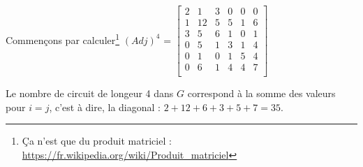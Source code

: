 \documentclass[fontsize=10pt]{article}
\begin{document}
Commençons par calculer\footnote{Ça n'est que du produit matriciel : \url{https://fr.wikipedia.org/wiki/Produit_matriciel}} $(Adj)^4$ = $\begin{bmatrix}
    2 &1 &3 &0 &0 &0 \\
    1 &12&5 &5 &1 &6 \\
    3 &5 &6 &1 &0 &1 \\
    0 &5 &1 &3 &1 &4 \\
    0 &1 &0 &1 &5 &4 \\
    0 &6 &1 &4 &4 &7 \\
\end{bmatrix}$

Le nombre de circuit de longeur 4 dans $G$ correspond à la somme des valeurs
pour $i = j$, c'est à dire, la diagonal : $2 + 12 + 6 + 3 + 5 + 7 = 35$.
\end{document}
